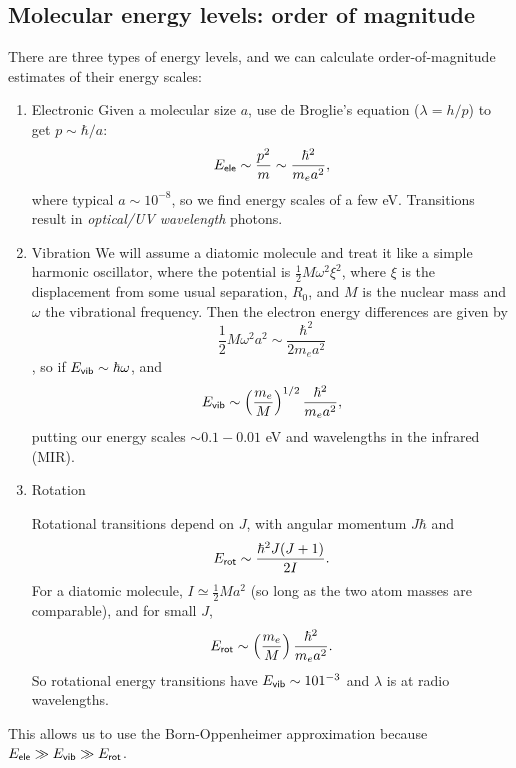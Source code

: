 \documentclass{tufte-handout}
\renewcommand{\rm}{\sf}
\begin{document}
\subsection{Molecular energy levels: order of magnitude}
There are three types of energy levels, and we can calculate order-of-magnitude estimates of their energy scales:
\begin{enumerate}
\item Electronic
Given a molecular size $a$, use de Broglie's equation ($\lambda = h/p$) to get $p \sim \hbar / a$:
\begin{equation}
E_{\rm ele} \sim \frac{p^2}{m} \sim \frac{\hbar^2}{m_e a^2},
\end{equation}
where typical $a \sim 10^{-8}$, so we find energy scales of a few eV. Transitions result in \textit{optical/UV wavelength} photons.

\item Vibration 
We will assume a diatomic molecule and treat it like a simple harmonic oscillator, where the potential is $\frac{1}{2}M \omega^2 \xi^2$, where $\xi$ is the displacement from some usual separation, $R_0$, and $M$ is the nuclear mass and $\omega$ the vibrational frequency. Then the electron energy differences are given by
\begin{equation}
\frac{1}{2}M \omega^2 a^2 \sim \frac{\hbar^2}{2 m_e a^2}
\end{equation},
so if $E_{\rm vib} \sim \hbar \omega$, and 
\begin{equation}
E_{\rm vib} \sim \left (\frac{m_e}{M}\right )^{1/2} \frac{\hbar^2}{m_e a^2},
\end{equation}
putting our energy scales $\sim 0.1-0.01$ eV and wavelengths in the infrared (MIR).

\item Rotation

Rotational transitions depend on $J$, with angular momentum $J \hbar$ and 
\begin{equation}
E_{\rm rot} \sim \frac{\hbar^2 J(J+1)}{2I}.
\end{equation}
For a diatomic molecule, $I \simeq \frac{1}{2}Ma^2$ (so long as the two atom masses are comparable), and for small $J$,
\begin{equation}
E_{\rm rot} \sim \left (\frac{m_e}{M}\right )\frac{\hbar^2}{m_e a^2}.
\end{equation}
So rotational energy transitions have $E_{\rm vib} \sim 101^{-3}$ and $\lambda$ is at radio wavelengths.
\end{enumerate}
This allows us to use the Born-Oppenheimer approximation because $E_{\rm ele} \gg E_{\rm vib} \gg E_{\rm rot}$.
\end{document}
